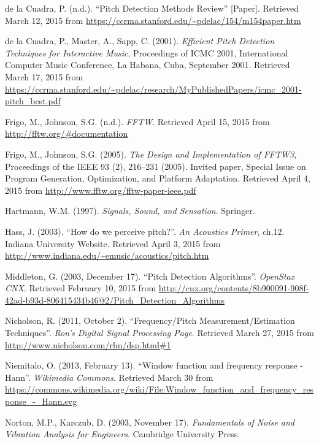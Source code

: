 \documentclass[12pt]{report}
\begin{document}
\begin{thebibliography}{100}
	 de la Cuadra, P. (n.d.). ``Pitch Detection Methods Review'' [Paper]. Retrieved March 12, 2015 from \url{https://ccrma.stanford.edu/~pdelac/154/m154paper.htm}
	
	 de la Cuadra, P., Master, A., Sapp, C. (2001). \emph{Efficient Pitch Detection Techniques for Interactive Music}, Proceedings of ICMC 2001, International Computer Music Conference, La Habana, Cuba, September 2001. Retrieved March 17, 2015 from \url{https://ccrma.stanford.edu/~pdelac/research/MyPublishedPapers/icmc_2001-pitch_best.pdf}
	
	 Frigo, M., Johnson, S.G. (n.d.). \emph{FFTW}. Retrieved April 15, 2015 from \url{http://fftw.org/#documentation}
	
	 Frigo, M., Johnson, S.G. (2005). \emph{The Design and Implementation of FFTW3}, Proceedings of the IEEE 93 (2), 216--231 (2005). Invited paper, Special Issue on Program Generation, Optimization, and Platform Adaptation. Retrieved April 4, 2015 from \url{http://www.fftw.org/fftw-paper-ieee.pdf}
	
	 Hartmann, W.M. (1997). \emph{Signals, Sound, and Sensation}. Springer.

	 Hass, J. (2003). ``How do we perceive pitch?''. \emph{An Acoustics Primer}, ch.12. Indiana University Website. Retrieved April 3, 2015 from \url{http://www.indiana.edu/~emusic/acoustics/pitch.htm}

	 Middleton, G. (2003, December 17). ``Pitch Detection Algorithms''. \emph{OpenStax CNX}. Retrieved February 10, 2015 from \url{http://cnx.org/contents/8b900091-908f-42ad-b93d-806415434b46@2/Pitch_Detection_Algorithms}

	 Nicholson, R. (2011, October 2). ``Frequency/Pitch Measurement/Estimation Techniques''. \emph{Ron's Digital Signal Processing Page}. Retrieved March 27, 2015 from \url{http://www.nicholson.com/rhn/dsp.html#1}

	 Niemitalo, O. (2013, February 13). ``Window function and frequency response - Hann''. \emph{Wikimedia Commons}. Retrieved March 30 from \url{https://commons.wikimedia.org/wiki/File:Window_function_and_frequency_response_-_Hann.svg}
	
	 Norton, M.P., Karczub, D. (2003, November 17). \emph{Fundamentals of Noise and Vibration Analysis for Engineers}. Cambridge University Press.
	

\end{thebibliography}
\end{document}

